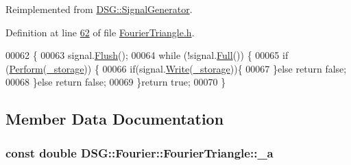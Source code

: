 Reimplemented from \hyperlink{class_d_s_g_1_1_signal_generator_ab050f80e84e6c8b3e354b56930d6a02b}{D\+S\+G\+::\+Signal\+Generator}.



Definition at line \hyperlink{_fourier_triangle_8h_source_l00062}{62} of file \hyperlink{_fourier_triangle_8h_source}{Fourier\+Triangle.\+h}.


\begin{DoxyCode}
00062                                                                            \{
00063             signal.\hyperlink{class_d_s_g_1_1_ring_buffer_ab23c8003d2857809a816068eeb209d60}{Flush}();
00064             \textcolor{keywordflow}{while} (!signal.\hyperlink{class_d_s_g_1_1_ring_buffer_a53ddb04ffcbb5470a8d2b0a3c65b70cb}{Full}()) \{
00065                 \textcolor{keywordflow}{if} (\hyperlink{class_d_s_g_1_1_fourier_1_1_fourier_triangle_ab5b947c1fc1f34a461c863b18e3e877d}{Perform}(\hyperlink{class_d_s_g_1_1_signal_generator_a28a9b47a1aa0783029f11a19ba0363f2}{\_storage})) \{
00066                     \textcolor{keywordflow}{if}(signal.\hyperlink{class_d_s_g_1_1_ring_buffer_aa5dd2caa0a270173251faee40a43d692}{Write}(\hyperlink{class_d_s_g_1_1_signal_generator_a28a9b47a1aa0783029f11a19ba0363f2}{\_storage}))\{
00067                     \}\textcolor{keywordflow}{else} \textcolor{keywordflow}{return} \textcolor{keyword}{false};
00068                 \}\textcolor{keywordflow}{else} \textcolor{keywordflow}{return} \textcolor{keyword}{false};
00069             \}\textcolor{keywordflow}{return} \textcolor{keyword}{true};
00070         \}
\end{DoxyCode}


\subsection{Member Data Documentation}
\hypertarget{class_d_s_g_1_1_fourier_1_1_fourier_triangle_a64263fc3fa98179d57d34a3f105d8c97}{
\subsubsection[{\+\_\+a}]{\setlength{\rightskip}{0pt plus 5cm}const double D\+S\+G\+::\+Fourier\+::\+Fourier\+Triangle\+::\+\_\+a\hspace{0.3cm}{\ttfamily [protected]}}}\label{class_d_s_g_1_1_fourier_1_1_fourier_triangle_a64263fc3fa98179d57d34a3f105d8c97}


